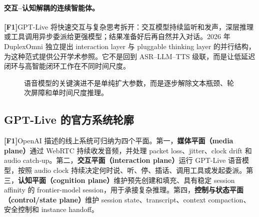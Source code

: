 \documentclass[UTF8,fontset=none,a4paper,10pt]{ctexart}
\newcommand{\FOne}{\textcolor{official}{\textbf{[F1]}}}
\begin{document}
\paragraph{交互--认知解耦的连续智能体。}
\FOne GPT-Live 将快速交互与复杂思考拆开：交互模型持续监听和发声，深层推理或工具调用异步委派给更强模型；结果准备好后再自然并入对话\cite{openai2026gptlive,openai2026continuous}。2026 年 DuplexOmni 独立提出 interaction layer 与 pluggable thinking layer 的并行结构\cite{huang2026duplexomni}，为这种范式提供公开学术参照。它不是回到 ASR--LLM--TTS 级联，而是让低延迟闭环与高智能闭环工作在不同时间尺度。

\begin{figure}[H]
\centering
{}
\caption{语音模型的关键演进不是单纯扩大参数，而是逐步解除文本瓶颈、轮次屏障和单时间尺度推理。}
\label{fig:evolution}
\end{figure}

\subsection{GPT-Live 的官方系统轮廓}

\FOne OpenAI 描述的线上系统可归纳为四个平面。第一，\textbf{媒体平面（media plane）}通过 WebRTC 持续收发音频，并处理 packet loss、jitter、clock drift 和 audio catch-up。第二，\textbf{交互平面（interaction plane）}运行 GPT-Live 语音模型，按照 audio clock 持续决定何时说、听、停、插话、调用工具或发起委派。第三，\textbf{认知平面（cognition plane）}维护预先创建和填充、具有稳定 session affinity 的 frontier-model session，用于承接复杂推理。第四，\textbf{控制与状态平面（control/state plane）}维护 session state、transcript、context compaction、安全控制和 instance handoff\cite{openai2026continuous,openai2026safety}。
\end{document}
